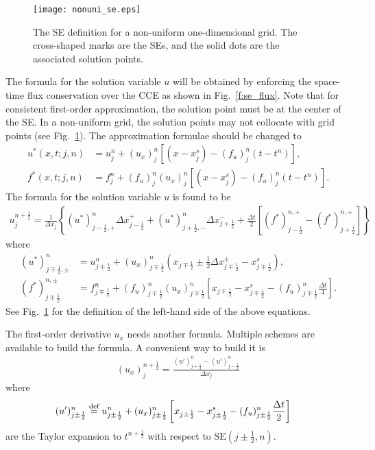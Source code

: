 \documentclass{turgon}
\begin{document}
\begin{figure}[hbtp]
  \centering
  \texttt{[image: nonuni\_se.eps]}
  \caption{The SE definition for a non-uniform one-dimensional grid.  The
  cross-shaped marks are the SEs, and the solid dots are the associated
  solution points.}
  \label{f:nonuni_se}
\end{figure}

The formula for the solution variable $u$ will be obtained by enforcing the
space-time flux conservation over the CCE as shown in Fig.~\ref{f:se_flux}.
Note that for consistent first-order approximation, the solution point must be
at the center of the SE.  In a non-uniform grid, the solution points may not
collocate with grid points (see Fig.~\ref{f:nonuni_se}).  The approximation
formulae should be changed to
\begin{align*}
  u^*(x,t;j,n) &= u_j^n + (u_x)_j^n \left[
    (x-x_j^s) - (f_u)_j^n(t-t^n)
  \right] , \\
  f^*(x,t;j,n) &= f_j^n + (f_u)_j^n (u_x)_j^n \left[
    (x-x_j^s) - (f_u)_j^n(t-t^n)
  \right] .
\end{align*}
The formula for the solution variable $u$ is found to be
\begin{align}
  u_j^{n+\frac{1}{2}}
    = \frac{1}{\Delta x_j}\left\{
      (u^*)_{j-\frac{1}{2},+}^n \Delta x_{j-\frac{1}{2}}^+
    + (u^*)_{j+\frac{1}{2},-}^n \Delta x_{j+\frac{1}{2}}^-
    + \frac{\Delta t}{2} \left[
        (f^*)_{j-\frac{1}{2}}^{n,+} 
      - (f^*)_{j+\frac{1}{2}}^{n,+}
      \right]
      \right\}
  \label{e:formula:u}
\end{align}
where
\begin{align*}
  (u^*)_{j\mp\frac{1}{2},\pm}^n
   &= u_{j\mp\frac{1}{2}}^n
    + (u_x)_{j\mp\frac{1}{2}}^n
      \left( x_{j\mp\frac{1}{2}}
           \pm \frac{1}{2} \Delta x_{j\mp\frac{1}{2}}^{\pm}
           - x_{j\mp\frac{1}{2}}^s \right), \\
  (f^*)_{j\mp\frac{1}{2}}^{n,\pm}
   &= f_{j\mp\frac{1}{2}}^n
    + (f_u)_{j\mp\frac{1}{2}}^n(u_x)_{j\mp\frac{1}{2}}^n
      \left[x_{j\mp\frac{1}{2}} - x_{j\mp\frac{1}{2}}^s
          - (f_u)_{j\mp\frac{1}{2}}^n \frac{\Delta t}{4}
      \right] .
\end{align*}
See Fig.~\ref{f:nonuni_se} for the definition of the left-hand side of the
above equations.

The first-order derivative $u_x$ needs another formula.  Multiple schemes are
available to build the formula.  A convenient way to build it is
\begin{align}
  (u_x)_j^{n+\frac{1}{2}} = \frac{
    (u')_{j+\frac{1}{2}}^n - (u')_{j-\frac{1}{2}}^n
  }{\Delta x_j}
  \label{e:formula:ux:c}
\end{align}
where
\begin{align*}
  (u')_{j\pm\frac{1}{2}}^n &\defeq
      u_{j\pm\frac{1}{2}}^n
    + (u_x)_{j\pm\frac{1}{2}}^n \left[
        x_{j\pm\frac{1}{2}} - x_{j\pm\frac{1}{2}}^s
      - (f_u)_{j\pm\frac{1}{2}}^n \frac{\Delta t}{2} \right]
\end{align*}
are the Taylor expansion to $t^{n+\frac{1}{2}}$ with respect to
$\mathrm{SE}(j\pm\frac{1}{2}, n)$.
\end{document}
